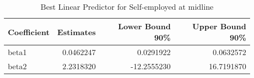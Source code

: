 \begin{table}

\caption{\label{tab:blpRselfempl}Best Linear Predictor for Self-employed at midline}
\centering
\begin{tabular}[t]{lrrr}
\toprule
Coefficient & Estimates & Lower Bound 90\% & Upper Bound 90\%\\
\midrule
beta1 & 0.0462247 & 0.0291922 & 0.0632572\\
beta2 & 2.2318320 & -12.2555230 & 16.7191870\\
\bottomrule
\end{tabular}
\end{table}
